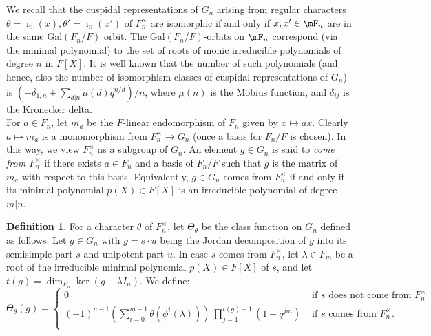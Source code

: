 \documentclass[reqno]{amsart}
\theoremstyle{definition}
\newtheorem{definition}[theorem]{Definition}
\theoremstyle{remark}
\numberwithin{equation}{section}
\begin{document}
We recall that the cuspidal representations of $G_n$ arising from regular characters $\theta=\imath_n(x), \theta'=\imath_n(x')$ of $F_n^\times$  are isomorphic if and only if $x, x' \in \mF_n$ are in the same Gal$(F_n/F)$ orbit. The Gal$(F_n/F)$-orbits on $\mF_n$ correspond (via the minimal polynomial) to the set of roots of monic irreducible polynomials of degree $n$ in $F[X]$. It is well known that the number of such polynomials (and hence, also the number of isomorphism classes of cuspidal representations of $G_n$) is $( -\delta_{1,n} + \sum_{d|n} \mu(d) q^{n/d} )/n$,
where  $\mu(n)$  is the M\"{o}bius  function, and $\delta_{ij}$ is the Kronecker delta. \\



For $a \in F_n$, let $m_a$ be the $F$-linear endomorphism of $F_n$ given by $x \mapsto a x$. Clearly $a \mapsto m_a$ is a monomorphism from $F_n^\times \to G_n$ (once a basis for $F_n/F$ is chosen). In this way, we view $F_n^\times$ as a subgroup of $G_n$. An element $g \in G_n$ is said to \emph{come from $F_n^\times$} if there exists $a\in F_n$ and a basis of $F_n/F$ such that $g$ is the  matrix of $m_a$ with respect to this basis. Equivalently, $g \in G_n$ comes from $F_n^\times$ if and only if its minimal polynomial $p(X) \in F[X]$ is an irreducible polynomial of degree $m|n$.
\begin{definition} \label{Theta_definition}
    For a character $\theta$ of $F_n^\times$, let $\Theta_\theta$ be the class function  on $G_n$ defined as follows. Let $g \in G_n$ with  $g=s \cdot u$ being the Jordan decomposition  of $g$ into its semisimple part  $s$ and unipotent part $u$. In case  $s$ comes from $F_n^\times$, let  $\lambda \in F_m$ be a root of  the irreducible minimal polynomial $p(X) \in F[X]$ of $s$, and let $t(g)=\dim_{F_n} \ker(g - \lambda I_n)$. We define:
\begin{equation} \label{eq:Theta_definition}
   \Theta_{\theta}(g)= \begin{cases} 
   0 &\text{ if $s$ does not come from $F_n^\times$} \\
   (-1)^{n-1}\left( \sum_{i=0}^{m-1} \theta(\phi^i(\lambda))\right) \,  \prod_{j=1}^{t(g)-1} (1-q^{jm}) &\text{ if $s$ comes from $F_n^\times$.} \\\end{cases} 
\end{equation}
\end{definition}
\end{document}
